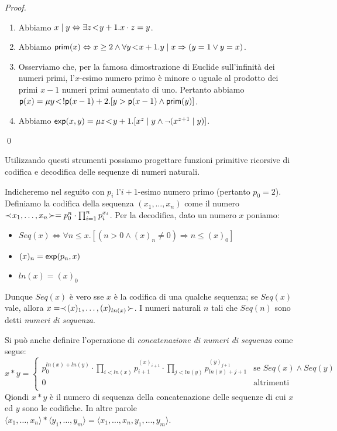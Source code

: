 \documentclass[runningheads,a4paper]{llncs}
\begin{document}
\begin{proof}
\begin{enumerate}[label=(\roman*)]
\item Abbiamo $x \mid y \Leftrightarrow \exists{z}\!<\!{y+1}.x\cdot z = y$.
\item Abbiamo $\mathsf{prim}(x) \Leftrightarrow x \geq 2 \wedge \forall{y}\!<\!{x+1}.y \mid x \Rightarrow (y = 1 \vee y = x)$.
\item Osserviamo che, per la famosa dimostrazione di Euclide sull'infinit\`{a} dei numeri primi, l'$x$-esimo numero primo \`{e} minore o uguale al prodotto dei primi $x-1$ numeri primi  aumentato di uno. Pertanto abbiamo $\mathsf{p}(x) = \mu{y}\!<\!{!\mathsf{p}(x-1)+2}.[y > \mathsf{p}(x-1) \wedge \mathsf{prim}(y)]$.
\item Abbiamo $\mathsf{exp}(x,y) = \mu{z}\!<\!{y+1}.[x^z\mid y \wedge \neg (x^{z+1}\mid y)]$.
\end{enumerate}
\qed\end{proof}

Utilizzando questi strumenti possiamo progettare funzioni primitive ricorsive di codifica e decodifica delle sequenze di numeri naturali. 

Indicheremo nel seguito con $p_i$ l'$i+1$-esimo numero primo (pertanto $p_0 = 2$).
 Definiamo la codifica della sequenza $(x_1,\ldots,x_n)$ come il numero
 $\prec\! x_1,\ldots,x_n \!\succ = p_0^n \cdot \prod_{i=1}^{n} p_i^{x_i}$. Per la decodifica, dato un numero $x$ poniamo:
\begin{itemize}
\item $Seq(x) \iff \forall n \leq x.[(n > 0 \wedge (x)_n \neq 0) \Rightarrow n \leq (x)_0]$
\item $(x)_n = \mathsf{exp}(p_n,x)$
\item $ln(x) = (x)_0$
\end{itemize}

Dunque $Seq(x)$ \`{e} vero sse $x$ \`{e} la codifica di una qualche sequenza; se $Seq(x)$ vale,
 allora $x = \prec\! (x)_1,\ldots,(x)_{ln(x)} \!\succ$. I numeri naturali $n$ tali che $Seq(n)$ sono detti \emph{numeri di sequenza}.

Si pu\`{o} anche definire l'operazione di \emph{concatenazione di numeri di sequenza} come segue:
$$
x \ast y =
\begin{cases}
p_0^{ln(x)+ln(y)} \cdot \prod_{i < ln(x)} p_{i+1}^{(x)_{i+1}} \cdot \prod_{j < ln(y)} p_{ln(x) + j+1}^{(y)_{j+1}} & \mbox{se $Seq(x) \wedge Seq(y)$} \\
0 & \mbox{altrimenti} \\
\end{cases}
$$
Qiondi $x \ast y$ \`{e} il numero di sequenza della concatenazione delle sequenze di cui $x$ ed $y$ sono le codifiche. In altre parole $\langle x_1,\ldots,x_n\rangle \ast \langle y_1,\ldots,y_m\rangle = \langle x_1,\ldots,x_n, y_1,\ldots,y_m\rangle$.
\end{document}
